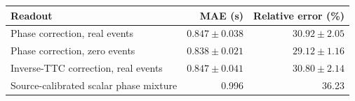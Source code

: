 \begin{tabular}{lrr}
\toprule
Readout & MAE (s) & Relative error (\%) \\
\midrule
Phase correction, real events & $0.847\pm0.038$ & $30.92\pm2.05$ \\
Phase correction, zero events & $0.838\pm0.021$ & $29.12\pm1.16$ \\
Inverse-TTC correction, real events & $0.847\pm0.041$ & $30.80\pm2.14$ \\
Source-calibrated scalar phase mixture & 0.996 & 36.23 \\
\bottomrule
\end{tabular}
